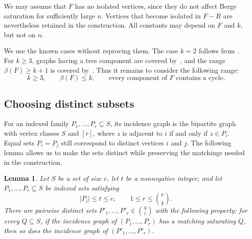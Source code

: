 \documentclass[11pt,a4paper]{article}
\numberwithin{equation}{section}
\newtheorem{lemma}[theorem]{Lemma}
\theoremstyle{definition}
\theoremstyle{plain}
\begin{document}
We may assume that $F$ has no isolated
vertices, since they do not affect Berge saturation for sufficiently
large $n$. Vertices that become isolated in $F-R$ are nevertheless
retained in the construction. All constants may depend on $F$ and $k$,
but not on $n$.

We use the known cases without reproving them. The case $k=2$ follows
from~\cite{KT}. For $k\ge3$, graphs having a tree component are covered
by~\cite[Observation~2.4]{EGMT}, and the range $\beta(F)\ge k+1$
is covered by~\cite[Theorem~2.5]{EGMT}. Thus it remains to consider
the following range:
\begin{equation}\label{eq:remaining}
 k\ge3,\qquad \beta(F)\le k,\qquad
 \text{every component of $F$ contains a cycle}.
\end{equation}

\subsection{Choosing distinct subsets}

For an indexed family $P_1,\ldots,P_r\subseteq S$, its incidence graph
is the bipartite graph with vertex classes $S$ and $[r]$, where $z$
is adjacent to $i$ if and only if $z\in P_i$. Equal sets $P_i=P_j$
still correspond to distinct vertices $i$ and $j$. The following
lemma allows us to make the sets distinct while preserving the
matchings needed in the construction.

\begin{lemma}\label{lem:distinct}
Let $S$ be a set of size $c$, let $t$ be a nonnegative integer, and
let $P_1,\ldots,P_r\subseteq S$ be indexed sets satisfying
\[
 |P_i|\le t\le c,\qquad 1\le r\le\binom ct.
\]
There are pairwise distinct sets $P'_1,\ldots,P'_r\in\binom St$ with
the following property: for every $Q\subseteq S$, if the incidence graph
of $(P_1,\ldots,P_r)$ has a matching saturating $Q$, then so does the
incidence graph of $(P'_1,\ldots,P'_r)$.
\end{lemma}
\end{document}
